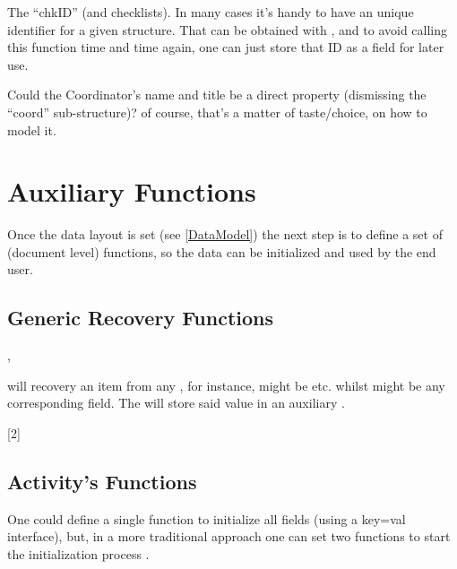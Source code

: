 \documentclass[10pt]{article}
\begin{document}
\begin{tsremark}
The ``chkID'' (and checklists). In many cases it's handy to have an unique identifier for a given structure. That can be obtained with , and to avoid calling this function time and time again, one can just store that ID as a field for later use.
\end{tsremark}
\begin{tsremark}
  Could the Coordinator's name and title be a direct property (dismissing the ``coord'' sub-structure)? of course, that's a matter of taste/choice, on how to model it.
\end{tsremark}



\section{Auxiliary Functions}
Once the data layout is set (see \ref{DataModel}) the next step is to define a set of (document level) functions, so the data can be initialized and used by the end user.

\subsection{Generic Recovery Functions}

\begin{codedescribe}{\DataField,\DataGet}
  \begin{codesyntax}
  \end{codesyntax}
\tsobj{\DataField} will recovery an item from any , for instance,  might be  etc. whilst  might be any corresponding field. The \tsobj{\DataGet} will store said value in an auxiliary .
\end{codedescribe}


[2]

\subsection{Activity's Functions}

One could define a single function to initialize all fields (using a key=val interface), but, in a more traditional approach  one can set two functions to start the initialization process \tsobj{\NewActivity,\ActivitySet}. 
\end{document}

